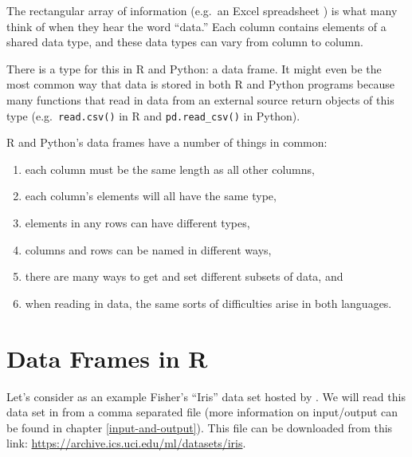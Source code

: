 \documentclass[
  12pt,
  krantz2]{krantz}
\providecommand{\tightlist}{%
  \setlength{\itemsep}{0pt}\setlength{\parskip}{0pt}}
\begin{document}
The rectangular array of information (e.g.~an Excel spreadsheet ) is what many think of when they hear the word ``data.'' Each column contains elements of a shared data type, and these data types can vary from column to column.

There is a type for this in R and Python: a data frame. It might even be the most common way that data is stored in both R and Python programs because many functions that read in data from an external source return objects of this type (e.g.~\texttt{read.csv()} in R and \texttt{pd.read\_csv()} in Python).

R and Python's data frames have a number of things in common:

\begin{enumerate}
\def\labelenumi{\arabic{enumi}.}
\tightlist
\item
  each column must be the same length as all other columns,
\item
  each column's elements will all have the same type,
\item
  elements in any rows can have different types,
\item
  columns and rows can be named in different ways,
\item
  there are many ways to get and set different subsets of data, and
\item
  when reading in data, the same sorts of difficulties arise in both languages.
\end{enumerate}

\hypertarget{data-frames-in-r}{%
\section{Data Frames in R}\label{data-frames-in-r}}

Let's consider as an example Fisher's ``Iris'' data set \citep{misc_iris_53} hosted by \citep{uci_data}. We will read this data set in from a comma separated file (more information on input/output can be found in chapter \ref{input-and-output}). This file can be downloaded from this link: \url{https://archive.ics.uci.edu/ml/datasets/iris}.
\end{document}
